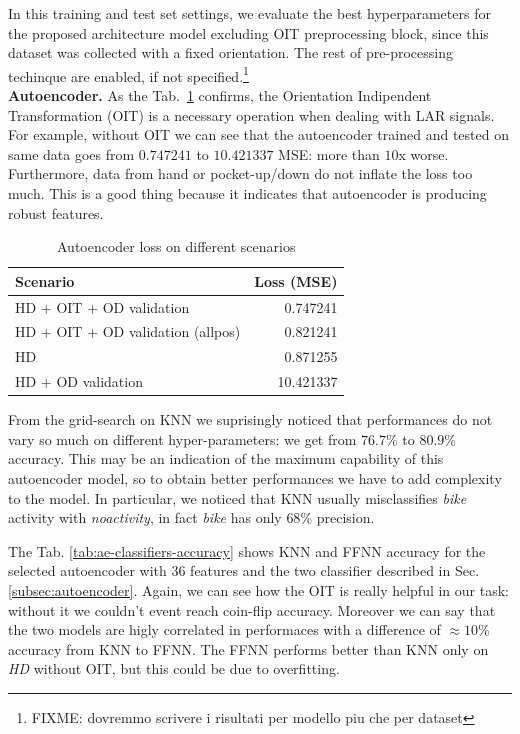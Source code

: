 In this training and test set settings, we evaluate the best
hyperparameters for the proposed architecture model excluding OIT
preprocessing block, since this dataset was collected with a fixed
orientation. The rest of pre-processing techinque are enabled, if not
specified.\footnote{FIXME: dovremmo scrivere i risultati per modello piu che per dataset}\\

\textbf{Autoencoder.}  As the Tab.~\ref{tab:ae-loss} confirms, the
Orientation Indipendent Transformation (OIT) is a necessary operation
when dealing with LAR signals. For example, without OIT we can see
that the autoencoder trained and tested on same data goes from
$0.747241$ to $10.421337$ MSE: more than $10$x worse. Furthermore,
data from hand or pocket-up/down do not inflate the loss too
much. This is a good thing because it indicates that autoencoder is
producing robust features.
\begin{table}[H]
  \centering
  \begin{tabular}{lr}
    \hline
    Scenario & Loss (MSE) \\
    \hline
    HD + OIT + OD validation & 0.747241 \\
    HD + OIT + OD validation (allpos) & 0.821241 \\
    HD & 0.871255 \\
    HD + OD validation & 10.421337 \\
    \hline
  \end{tabular}
  \caption{Autoencoder loss on different scenarios}
  \label{tab:ae-loss}
\end{table}

From the grid-search on KNN we suprisingly noticed that performances
do not vary so much on different hyper-parameters: we get from
$76.7$\% to $80.9$\% accuracy. This may be an indication of the
maximum capability of this autoencoder model, so to obtain better
performances we have to add complexity to the model. In particular, we
noticed that KNN usually misclassifies \textit{bike} activity with
\textit{no\textunderscore activity}, in fact \textit{bike} has only
$68$\% precision.

The Tab. \ref{tab:ae-classifiers-accuracy} shows KNN and FFNN accuracy
for the selected autoencoder with $36$ features and the two
classifier described in Sec. \ref{subsec:autoencoder}. Again,
we can see how the OIT is really helpful in our task: without it we
couldn't event reach coin-flip accuracy. Moreover we can say that the
two models are higly correlated in performaces with a difference of
$\approx 10$\% accuracy from KNN to FFNN. The FFNN performs better
than KNN only on \textit{HD} without OIT, but this could be due to
overfitting.

